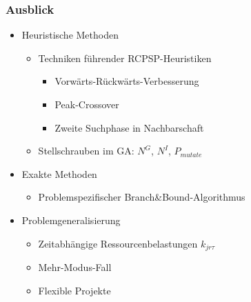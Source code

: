 \begin{frame}
\frametitle{Ausblick}
\begin{itemize}
\item Heuristische Methoden
	\begin{itemize}
	\item Techniken führender RCPSP-Heuristiken
		\begin{itemize}
		\item Vorwärts-Rückwärts-Verbesserung
		\item Peak-Crossover
		\item Zweite Suchphase in Nachbarschaft
		\end{itemize}
	\item Stellschrauben im GA: $N^G$, $N^I$, $P_{mutate}$\\[4mm]
	\end{itemize}
	
\item Exakte Methoden
	\begin{itemize}\item Problemspezifischer Branch\&Bound-Algorithmus\\[4mm]\end{itemize}
	
\item Problemgeneralisierung
	\begin{itemize}
	\item Zeitabhängige Ressourcenbelastungen $k_{jr\tau}$
	\item Mehr-Modus-Fall
	\item Flexible Projekte
	\end{itemize}
\end{itemize}
\end{frame}




